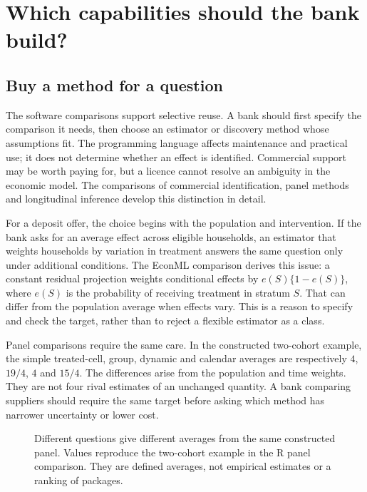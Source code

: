 \chapter{Which capabilities should the bank build?}
\label{reading:software-conclusions}

\section{Buy a method for a question}

The software comparisons support selective reuse. A bank should first specify
the comparison it needs, then choose an estimator or discovery method whose
assumptions fit. The programming language affects maintenance and practical
use; it does not determine whether an effect is identified. Commercial support
may be worth paying for, but a licence cannot resolve an ambiguity in the
economic model. The comparisons of commercial identification, panel methods
and longitudinal inference develop this distinction in detail.

For a deposit offer, the choice begins with the population and intervention.
If the bank asks for an average effect across eligible households, an estimator
that weights households by variation in treatment answers the same question
only under additional conditions. The EconML comparison derives this issue:
a constant residual projection weights conditional effects by
$e(S)\{1-e(S)\}$, where $e(S)$ is the probability of receiving treatment in
stratum $S$. That can differ from the population average when effects vary.
This is a reason to specify and check the target, rather than to reject a
flexible estimator as a class.\citep{exec19_econml_source,exec19_econml_reference}

Panel comparisons require the same care. In the constructed two-cohort example,
the simple treated-cell, group, dynamic and calendar averages are respectively
$4$, $19/4$, $4$ and $15/4$. The differences arise from the population and time
weights. They are not four rival estimates of an unchanged quantity. A bank
comparing suppliers should require the same target before asking which method
has narrower uncertainty or lower cost.\citep{exec24_panelr_did,exec24_panelr_contract}

\begin{figure}[htbp]\centering
{}
\caption{Different questions give different averages from the same constructed
panel. Values reproduce the two-cohort example in the R panel comparison.
They are defined averages, not empirical estimates or a ranking of packages.
\citep{exec24_panelr_contract}}
\label{reading:panel-averages}
\end{figure}

